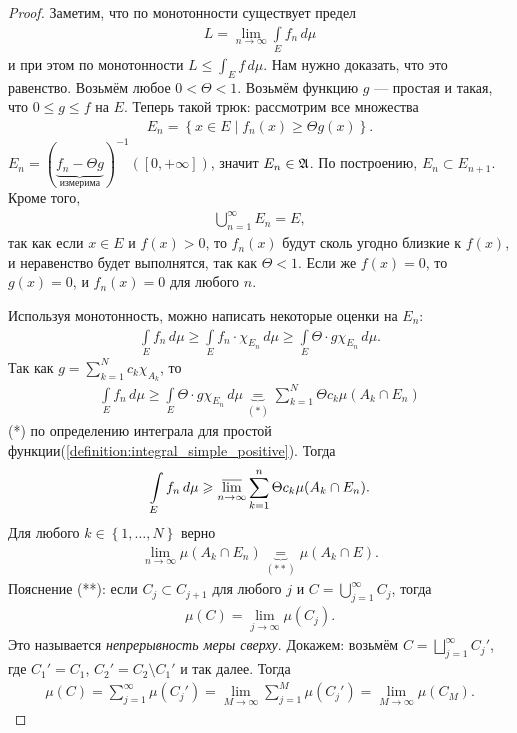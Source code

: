 \begin{proof}
 Заметим, что по монотонности существует предел 
\begin{align*}
L = \lim_{n \to \infty} \int\limits_E f_n \, d\mu
\end{align*} и при этом по монотонности $L \leqslant \int_E f\,d\mu$. Нам нужно доказать, что это равенство. Возьмём любое $0 < \Theta < 1$. Возьмём функцию $g$ --- простая и такая, что $0 \leqslant g \leqslant f$ на $E$. Теперь такой трюк: рассмотрим все множества \begin{align*}
 E_n = \left\{ x \in E \mid f_n(x) \geqslant \Theta g(x) \right\}
 .\end{align*} $E_n = (\underbrace{f_n - \Theta g}_{\text{ измерима }})^{-1}([0, +\infty])$, значит $E_n \in \mathfrak{A}$. По построению, $E_n \subset E_{n+1}$. Кроме того, \begin{align*}
 \bigcup_{n=1}^{\infty} E_n = E
,\end{align*} так как если $x \in E$ и $f(x) > 0$, то $f_n(x)$ будут сколь угодно близкие к  $f(x)$, и неравенство будет выполнятся, так как  $\Theta < 1$. Если же  $f(x) = 0$, то  $g(x) = 0$, и $f_n(x) = 0$ для любого  $n$.

Используя монотонность, можно написать некоторые оценки на $E_n$: \begin{align*}
 \int\limits_E f_n \, d\mu \geqslant \int\limits_{E} f_n \cdot \chi_{E_n} \, d\mu \geqslant \int\limits_E \Theta \cdot g \chi_{E_n} \, d\mu
.\end{align*} Так как $g = \sum_{k=1}^{N} c_k \chi_{A_k}$, то \begin{align*}
\int\limits_E f_n \, d\mu \geqslant \int\limits_E \Theta \cdot g\chi_{E_n} \, d\mu \underbrace{=}_{(*)} \sum_{k=1}^{N} \Theta c_k \mu (A_k \cap E_n)
\end{align*}  (*) по определению интеграла для простой функции(\ref{definition:integral_simple_positive}). Тогда \begin{align*}
\int\limits_E f_n\, d\mu \geqslant \varlimsup_{n \to \infty} \sum_{k=1}^{n} \Theta c_k \mu(A_k \cap E_n)
.\end{align*} Для любого $k \in \left\{ 1, \ldots, N \right\}$ верно \begin{align*}
\lim_{n\to \infty} \mu(A_k \cap E_n) \underbrace{=}_{(**)} \mu(A_k \cap E)
.\end{align*} Пояснение (**): если $C_j \subset C_{j+1}$ для любого $j$ и  $C = \bigcup_{j=1}^{\infty} C_j$, тогда \begin{align*}
\mu(C) = \lim_{j \to \infty} \mu(C_j)
.\end{align*} Это называется \textit{непрерывность меры сверху}. Докажем: возьмём $C = \bigsqcup_{j=1}^{\infty} C_j' $, где $C_1' = C_1$,  $C_2' = C_2 \setminus C_1'$ и так далее. Тогда \begin{align*}
\mu(C) = \sum_{j=1}^{\infty} \mu( C_j' ) = \lim_{M \to \infty} \sum_{j=1}^{M}  \mu(C_j') = \lim_{M \to \infty} \mu(C_M)
.\end{align*} 


\end{proof}
